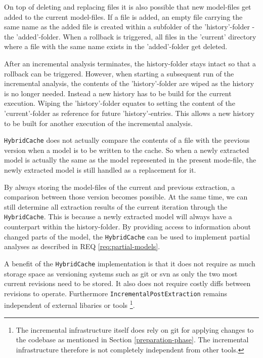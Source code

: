 \documentclass[a4paper]{article}
\begin{document}
 On top of deleting and replacing files it is also possible that new model-files get added to the current model-files. If a file is added, an empty file carrying the same name as the added file is created within a subfolder of the 'history'-folder - the 'added'-folder. When a rollback is triggered, all files in the 'current' directory where a file with the same name exists in the 'added'-folder get deleted.
 
After an incremental analysis terminates, the history-folder stays intact so that a rollback can be triggered. 
However, when starting a subsequent run of the incremental analysis, the contents of the 'history'-folder are wiped as the history is no longer needed. Instead a new history has to be build for the current execution. Wiping the 'history'-folder equates to setting the content of the 'current'-folder as reference for future 'history'-entries. This allows a new history to be built for another execution of the incremental analysis.
  
 \texttt{Hybrid\-Cache} does not actually compare the contents of a file with the previous version when a model is to be written to the cache. So when a newly extracted model is actually the same as the model represented in the present mode-file, the newly extracted model is still handled as a replacement for it. 
  
 By always storing the model-files of the current and previous extraction, a comparison between those version becomes possible. At the same time, we can still determine all extraction results of the current iteration through the \texttt{Hybrid\-Cache}. This is because a newly extracted model will always have a counterpart within the history-folder. By providing access to information about changed parts of the model, the \texttt{Hybrid\-Cache} can be used to implement partial analyses as described in REQ \ref{req:partial-models}.
   
 A benefit of the \texttt{Hybrid\-Cache} implementation is that it does not require as much storage space as versioning systems such as git or svn as only the two most current revisions need to be stored. It also does not require costly diffs between revisions to operate. Furthermore \texttt{Incremental\-Post\-Extraction} remains independent of external libaries or tools \footnote{The incremental infrastructure itself does rely on git for applying changes to the codebase as mentioned in Section \ref{preparation-phase}. The incremental infrastructure therefore is not completely independent from other tools.}.
 
\end{document}
